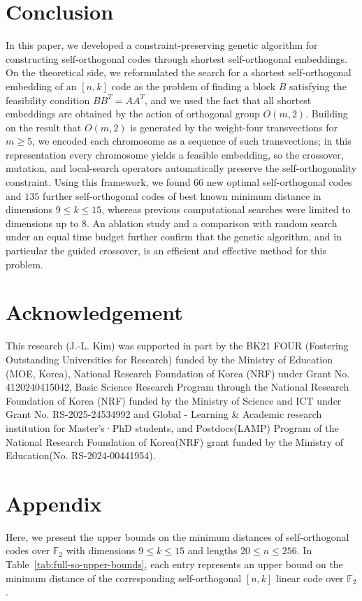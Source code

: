 \documentclass{article}
\begin{document}
\section{Conclusion}
In this paper, we developed a constraint-preserving genetic algorithm for constructing self-orthogonal codes through shortest self-orthogonal embeddings. On the theoretical side, we reformulated the search for a shortest self-orthogonal embedding of an $[n,k]$ code as the problem of finding a block $B$ satisfying the feasibility condition $BB^{T}=AA^{T}$, and we used the fact that all shortest embeddings are obtained by the action of orthogonal group $O(m,2)$. Building on the result that $O(m,2)$ is generated by the weight-four transvections for $m\geq5$, we encoded each chromosome as a sequence of such transvections; in this representation every chromosome yields a feasible embedding, so the crossover, mutation, and local-search operators automatically preserve the self-orthogonality constraint. 
Using this framework, we found $66$ new optimal self-orthogonal codes and $135$ further self-orthogonal codes of best known minimum distance in dimensions $9\leq k\leq15$, whereas previous computational searches were limited to dimensions up to $8$. An ablation study and a comparison with random search under an equal time budget further confirm that the genetic algorithm, and in particular the guided crossover, is an efficient and effective method for this problem.

\section*{Acknowledgement}
This research (J.-L. Kim) was supported in part by the BK21 FOUR (Fostering Outstanding Universities for Research) funded by the Ministry of Education (MOE, Korea), National Research Foundation of Korea (NRF) under Grant No. 4120240415042, Basic Science Research Program through the National Research Foundation of Korea (NRF) funded by the Ministry of Science and ICT under Grant No. RS-2025-24534992 and Global - Learning \& Academic research institution for Master’s·PhD students, and Postdocs(LAMP) Program of the National Research Foundation of Korea(NRF) grant funded by the Ministry of Education(No. RS-2024-00441954).

\section*{Appendix}
Here, we present the upper bounds on the minimum distances of self-orthogonal codes over $\mathbb{F}_2$ with dimensions $9\le k\le 15$ and lengths $20\le n\le 256$. In Table~\ref{tab:full-so-upper-bounds}, each entry represents an upper bound on the minimum distance of the corresponding self-orthogonal $[n,k]$ linear code over $\mathbb{F}_2$.
\end{document}
